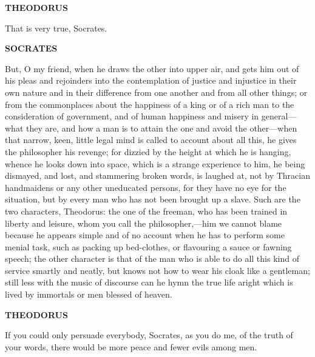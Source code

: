 \documentclass[11pt,letter]{article}
\begin{document}
\par \textbf{THEODORUS}
\par   That is very true, Socrates.

\par \textbf{SOCRATES}
\par   But, O my friend, when he draws the other into upper air, and gets him out of his pleas and rejoinders into the contemplation of justice and injustice in their own nature and in their difference from one another and from all other things; or from the commonplaces about the happiness of a king or of a rich man to the consideration of government, and of human happiness and misery in general—what they are, and how a man is to attain the one and avoid the other—when that narrow, keen, little legal mind is called to account about all this, he gives the philosopher his revenge; for dizzied by the height at which he is hanging, whence he looks down into space, which is a strange experience to him, he being dismayed, and lost, and stammering broken words, is laughed at, not by Thracian handmaidens or any other uneducated persons, for they have no eye for the situation, but by every man who has not been brought up a slave. Such are the two characters, Theodorus:  the one of the freeman, who has been trained in liberty and leisure, whom you call the philosopher,—him we cannot blame because he appears simple and of no account when he has to perform some menial task, such as packing up bed-clothes, or flavouring a sauce or fawning speech; the other character is that of the man who is able to do all this kind of service smartly and neatly, but knows not how to wear his cloak like a gentleman; still less with the music of discourse can he hymn the true life aright which is lived by immortals or men blessed of heaven.

\par \textbf{THEODORUS}
\par   If you could only persuade everybody, Socrates, as you do me, of the truth of your words, there would be more peace and fewer evils among men.
\end{document}
